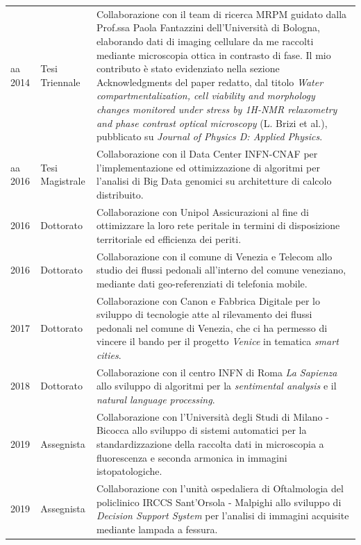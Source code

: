 \documentclass[a4paper,11pt]{article}
\begin{document}
\begin{tabular}{llp{12cm}}

  aa 2014             & Tesi Triennale  & Collaborazione con il team di ricerca MRPM guidato dalla Prof.ssa Paola Fantazzini dell'Università di Bologna, elaborando dati di imaging cellulare da me raccolti mediante microscopia ottica in contrasto di fase. Il mio contributo è stato evidenziato nella sezione Acknowledgments del paper redatto, dal titolo \emph{Water compartmentalization, cell viability and morphology changes monitored under stress by 1H-NMR relaxometry and phase contrast optical microscopy} (L. Brizi et al.), pubblicato su \emph{Journal of Physics D: Applied Physics}. \\
  aa 2016             & Tesi Magistrale & Collaborazione con il Data Center INFN-CNAF per l'implementazione ed ottimizzazione di algoritmi per l'analisi di Big Data genomici su architetture di calcolo distribuito.\\
  2016\textemdash2017 & Dottorato       & Collaborazione con Unipol Assicurazioni al fine di ottimizzare la loro rete peritale in termini di disposizione territoriale ed efficienza dei periti.\\
  2016\textemdash2017 & Dottorato       & Collaborazione con il comune di Venezia e Telecom allo studio dei flussi pedonali all'interno del comune veneziano, mediante dati geo-referenziati di telefonia mobile. \\
  2017\textemdash2018 & Dottorato       & Collaborazione con Canon e Fabbrica Digitale per lo sviluppo di tecnologie atte al rilevamento dei flussi pedonali nel comune di Venezia, che ci ha permesso di vincere il bando per il progetto \emph{Venice} in tematica \emph{smart cities}. \\
  2018\textemdash2019 & Dottorato       & Collaborazione con il centro INFN di Roma \emph{La Sapienza} allo sviluppo di algoritmi per la \emph{sentimental analysis} e il \emph{natural language processing}.\\
  2019                & Assegnista      & Collaborazione con l'Università degli Studi di Milano - Bicocca allo sviluppo di sistemi automatici per la standardizzazione della raccolta dati in microscopia a fluorescenza e seconda armonica in immagini istopatologiche.\\
  2019                & Assegnista      & Collaborazione con l'unità ospedaliera di Oftalmologia del policlinico IRCCS Sant'Orsola - Malpighi allo sviluppo di \emph{Decision Support System} per l'analisi di immagini acquisite mediante lampada a fessura.\\

\end{tabular}
\end{document}
